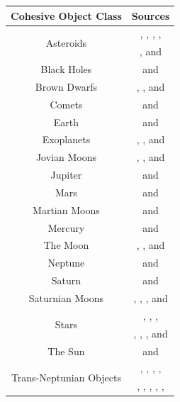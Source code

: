 \documentclass[twocolumn,linenumbers]{aastex631}
\begin{document}
\begin{table}[p] 
\centering 
\begin{tabular}{|c|c|}
\hline
Cohesive Object Class & Sources \\
\hline
\multirow{2}{3.5em}{Asteroids} & \cite{Carry2012}, \cite{Lauretta2019}, \cite{Nakano2022}, \cite{Russell2012}, \\
& \cite{Vernazza2021}, and \cite{Watanabe2019} \\  
\hline
Black Holes & \cite{EHTC2019} and \cite{GRAVITY2023} \\
\hline
Brown Dwarfs & \cite{Grieves2021}, \cite{Limbach2024}, and \cite{Stassun2007} \\
\hline
Comets & \cite{Carry2012} and \cite{Patzold2016} \\
\hline
Earth & \cite{Archinal2018} and \cite{Folkner2008} \\
\hline
Exoplanets & \cite{Kanodia2024}, \cite{NASAExoplanetArchive}, and \cite{Xuan2024} \\
\hline
Jovian Moons & \cite{Anderson2005}, \cite{Archinal2018}, and \cite{Bagenal2007} \\
\hline
Jupiter & \cite{Archinal2018} and \cite{Bagenal2007} \\
\hline
Mars & \cite{Archinal2018} and \cite{Bills2005} \\
\hline
Martian Moons & \cite{Archinal2018} and \cite{Bills2005} \\
\hline
Mercury & \cite{Archinal2018} and \cite{Anderson1987} \\
\hline
The Moon & \cite{Archinal2018}, \cite{Goossens2016}, and \cite{Lemoine2014} \\
\hline
Neptune & \cite{Archinal2018} and \cite{Jacobson2009} \\
\hline
Saturn & \cite{Archinal2018} and \cite{Jacobson2006} \\
\hline
Saturnian Moons & \cite{Archinal2018}, \cite{Jacobson2006}, \cite{Jacobson2022}, and \cite{Thomas2020} \\
\hline
\multirow{2}{2em}{Stars} & \cite{Boetticher2017}, \cite{Bond2017}, \cite{Grieves2021}, \\ & \cite{Morin2010}, \cite{Pineda2021}, \cite{Southworth2015}, and \cite{Torres2010} \\
\hline
The Sun & \cite{Emilio2012} and \cite{Park2021} \\
\hline
\multirow{3}{10.1em}{Trans-Neptunian Objects} & \cite{Borzovic2015}, \cite{Brown2017}, \cite{Carry2012}, \cite{Holler2021}, \\
& \cite{Kiss2019}, \cite{Nimmo2017}, \cite{Ortiz2012}, \cite{Ortiz2017}, \cite{Ragozzine2009}, \\

\end{tabular}
\end{table}
\end{document}
